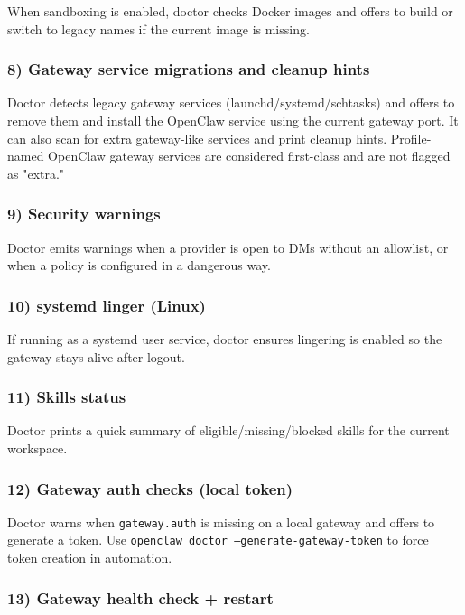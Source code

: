 When sandboxing is enabled, doctor checks Docker images and offers to build or
switch to legacy names if the current image is missing.

\subsubsection{8) Gateway service migrations and cleanup hints}


Doctor detects legacy gateway services (launchd/systemd/schtasks) and
offers to remove them and install the OpenClaw service using the current gateway
port. It can also scan for extra gateway-like services and print cleanup hints.
Profile-named OpenClaw gateway services are considered first-class and are not
flagged as "extra."

\subsubsection{9) Security warnings}


Doctor emits warnings when a provider is open to DMs without an allowlist, or
when a policy is configured in a dangerous way.

\subsubsection{10) systemd linger (Linux)}


If running as a systemd user service, doctor ensures lingering is enabled so the
gateway stays alive after logout.

\subsubsection{11) Skills status}


Doctor prints a quick summary of eligible/missing/blocked skills for the current
workspace.

\subsubsection{12) Gateway auth checks (local token)}


Doctor warns when \texttt{gateway.auth} is missing on a local gateway and offers to
generate a token. Use \texttt{openclaw doctor --generate-gateway-token} to force token
creation in automation.

\subsubsection{13) Gateway health check + restart}


